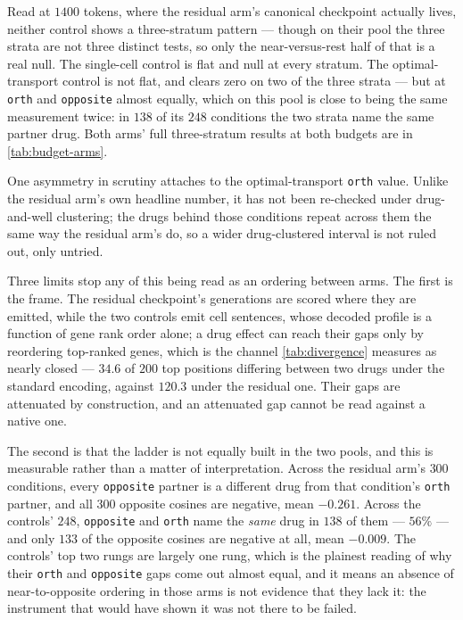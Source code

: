 Read at $1400$ tokens, where the residual arm's canonical checkpoint actually
lives, neither control shows a three-stratum pattern --- though on their pool the
three strata are not three distinct tests, so only the near-versus-rest half of
that is a real null. The
single-cell control is flat and null at every stratum. The optimal-transport
control is not flat, and clears zero on two of the three strata --- but at
\texttt{orth} and \texttt{opposite} almost equally, which on this pool is close to
being the same measurement twice: in $\num{138}$ of its $\num{248}$ conditions the
two strata name the same partner drug. Both arms'
full three-stratum results at both budgets are in \cref{tab:budget-arms}.

One asymmetry in scrutiny attaches to the optimal-transport \texttt{orth} value.
Unlike the residual arm's own headline number, it has not been re-checked under
drug-and-well clustering; the drugs behind those conditions repeat across them
the same way the residual arm's do, so a wider drug-clustered interval is not
ruled out, only untried.

Three limits stop any of this being read as an ordering between arms. The first
is the frame. The residual checkpoint's generations are scored where they are
emitted, while the two controls emit cell sentences, whose decoded profile is a
function of gene rank order alone; a drug effect can reach their gaps only by
reordering top-ranked genes, which is the channel \cref{tab:divergence} measures
as nearly closed --- $34.6$ of $200$ top positions differing between two drugs
under the standard encoding, against $120.3$ under the residual one. Their gaps
are attenuated by construction, and an attenuated gap cannot be read against a
native one.

The second is that the ladder is not equally built in the two pools, and this is
measurable rather than a matter of interpretation. Across the residual arm's
$\num{300}$ conditions, every \texttt{opposite} partner is a different drug from
that condition's \texttt{orth} partner, and all $\num{300}$ opposite cosines are
negative, mean $-0.261$. Across the controls' $\num{248}$, \texttt{opposite} and
\texttt{orth} name the \emph{same} drug in $\num{138}$ of them --- $\num{56}\%$
--- and only $\num{133}$ of the opposite cosines are negative at all, mean
$-0.009$. The controls' top two rungs are largely one rung, which is the plainest
reading of why their \texttt{orth} and \texttt{opposite} gaps come out almost
equal, and it means an absence of near-to-opposite ordering in those arms is not
evidence that they lack it: the instrument that would have shown it was not there
to be failed.

